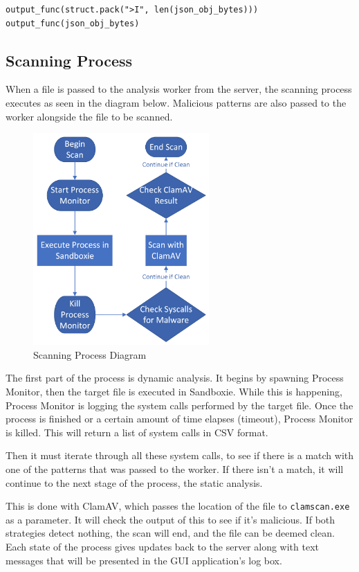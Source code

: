 \begin{lstlisting}
output_func(struct.pack(">I", len(json_obj_bytes)))
output_func(json_obj_bytes)
\end{lstlisting}

\subsection{Scanning Process}
When a file is passed to the analysis worker from the server,
the scanning process executes as seen in the diagram below.
Malicious patterns are also passed to the worker
alongside the file to be scanned.

\begin{figure}[h!]
    \centering
    \includegraphics[width=0.6\textwidth]{images/diagrams/scan_process}
    \caption{Scanning Process Diagram}
    \label{image:scanningProcess}
\end{figure}

The first part of the process is dynamic analysis.
It begins by spawning Process Monitor,
then the target file is executed in Sandboxie.
While this is happening,
Process Monitor is logging the system calls performed by the target file.
Once the process is finished or a certain amount of time elapses (timeout),
Process Monitor is killed. This will return a list of system calls in CSV format.

Then it must iterate through all these system calls,
to see if there is a match with one of the patterns
that was passed to the worker.
If there isn't a match, it will continue to the next stage of the process,
the static analysis.

This is done with ClamAV,
which passes the location of the file to
\texttt{clamscan.exe} as a parameter.
It will check the output of this to see if it's malicious.
If both strategies detect nothing,
the scan will end, and the file can be deemed clean.
Each state of the process gives updates back to the server along with
text messages that will be presented
in the GUI application's log box.

